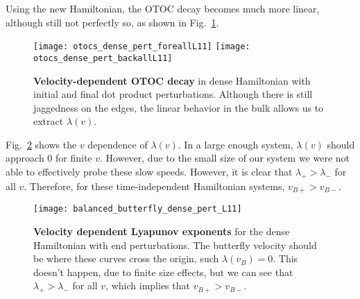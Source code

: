 Using the new Hamiltonian, the OTOC decay becomes much more linear, although still not perfectly so, as shown in Fig.~\ref{fig:otocs_pert}.
\begin{figure}
	\centering
	\texttt{[image: otocs\_dense\_pert\_foreallL11]}
	\texttt{[image: otocs\_dense\_pert\_backallL11]}
	\caption{\textbf{Velocity-dependent OTOC decay} in dense Hamiltonian with initial and final dot product perturbations. Although there is still jaggedness on the edges, the linear behavior in the bulk allows us to extract $\lambda(v)$.}
	\label{fig:otocs_pert}
\end{figure}
Fig.~\ref{fig:balanced_butterfly_dense_pert_L11} shows the $v$ dependence of $\lambda(v)$. In a large enough system, $\lambda(v)$ should approach 0 for finite $v$. However, due to the small size of our system we were not able to effectively probe these slow speeds. However, it is clear that $\lambda_+>\lambda_-$ for all $v$. Therefore, for these time-independent Hamiltonian systems, $v_{B+}>v_{B-}$.
\begin{figure}
	\centering
	\texttt{[image: balanced\_butterfly\_dense\_pert\_L11]}
	\caption{\textbf{Velocity dependent Lyapunov exponents} for the dense Hamiltonian with end perturbations. The butterfly velocity should be where these curves cross the origin, such $\lambda(v_B) = 0$. This doesn't happen, due to finite size effects, but we can see that $\lambda_+>\lambda_-$ for all $v$, which implies that $v_{B+}>v_{B-}$.}
	\label{fig:balanced_butterfly_dense_pert_L11}
\end{figure}
